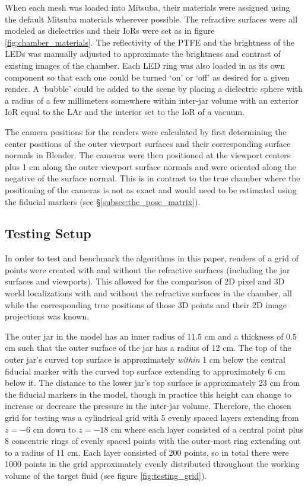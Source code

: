 \documentclass[11pt, letterpaper]{extarticle} %
\begin{document}
When each mesh was loaded into Mitsuba, their materials were assigned using the default Mitsuba materials wherever possible. The refractive surfaces were all modeled as dielectrics and their IoRs were set as in figure \ref{fig:chamber_materials}. The reflectivity of the PTFE and the brightness of the LEDs was manually adjusted to approximate the brightness and contrast of existing images of the chamber. Each LED ring was also loaded in as its own component so that each one could be turned `on' or `off' as desired for a given render. A `bubble' could be added to the scene by placing a dielectric sphere with a radius of a few millimeters somewhere within inter-jar volume with an exterior IoR equal to the LAr and the interior set to the IoR of a vacuum. 

The camera positions for the renders were calculated by first determining the center positions of the outer viewport surfaces and their corresponding surface normals in Blender. The cameras were then positioned at the viewport centers plus 1 cm along the outer viewport surface normals and were oriented along the negative of the surface normal. This is in contrast to the true chamber where the positioning of the cameras is not as exact and would need to be estimated using the fiducial markers (see \S\ref{subsec:the_pose_matrix}). 

\subsection{Testing Setup} \label{subsec:testing_setup}
In order to test and benchmark the algorithms in this paper, renders of a grid of points were created with and without the refractive surfaces (including the jar surfaces and viewports). This allowed for the comparison of 2D pixel and 3D world localizations with and without the refractive surfaces in the chamber, all while the corresponding true positions of those 3D points and their 2D image projections was known. 

The outer jar in the model has an inner radius of 11.5 cm and a thickness of 0.5 cm such that the outer surface of the jar has a radius of 12 cm. The top of the outer jar's curved top surface is approximately \textit{within} 1 cm below the central fiducial marker with the curved top surface extending to approximately 6 cm below it. The distance to the lower jar's top surface is approximately 23 cm from the fiducial markers in the model, though in practice this height can change to increase or decrease the pressure in the inter-jar volume. Therefore, the chosen grid for testing was a cylindrical grid with 5 evenly spaced layers extending from $z=-6$ cm down to $z=-18$ cm where each layer consisted of a central point plus 8 concentric rings of evenly spaced points with the outer-most ring extending out to a radius of 11 cm. Each layer consisted of 200 points, so in total there were 1000 points in the grid approximately evenly distributed throughout the working volume of the target fluid (see figure \ref{fig:testing_grid}).
\end{document}
